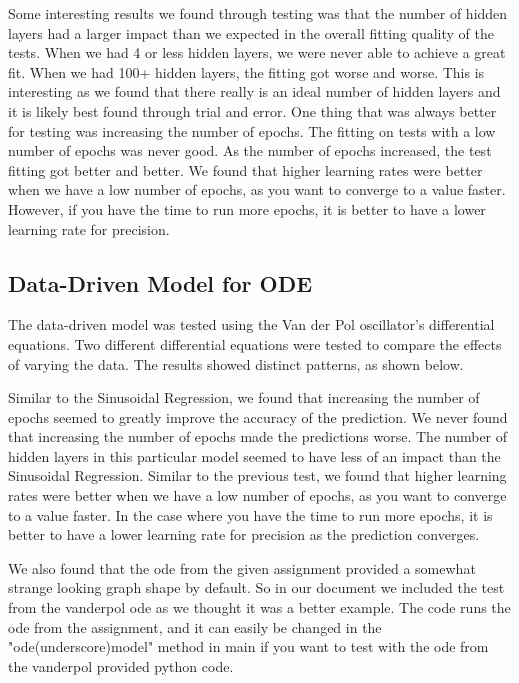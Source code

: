 \documentclass{article}
\begin{document}
Some interesting results we found through testing was that the number of hidden layers had a larger impact than we expected in the overall fitting quality of the tests. When we had 4 or less hidden layers, we were never able to achieve a great fit. When we had 100+ hidden layers, the fitting got worse and worse. This is interesting as we found that there really is an ideal number of hidden layers and it is likely best found through trial and error. One thing that was always better for testing was increasing the number of epochs. The fitting on tests with a low number of epochs was never good. As the number of epochs increased, the test fitting got better and better. We found that higher learning rates were better when we have a low number of epochs, as you want to converge to a value faster. However, if you have the time to run more epochs, it is better to have a lower learning rate for precision.

\subsection{Data-Driven Model for ODE}
The data-driven model was tested using the Van der Pol oscillator’s differential equations. Two different differential equations were tested to compare the effects of varying the data. The results showed distinct patterns, as shown below.

Similar to the Sinusoidal Regression, we found that increasing the number of epochs seemed to greatly improve the accuracy of the prediction. We never found that increasing the number of epochs made the predictions worse. The number of hidden layers in this particular model seemed to have less of an impact than the Sinusoidal Regression. Similar to the previous test, we found that higher learning rates were better when we have a low number of epochs, as you want to converge to a value faster. In the case where you have the time to run more epochs, it is better to have a lower learning rate for precision as the prediction converges.

We also found that the ode from the given assignment provided a somewhat strange looking graph shape by default. So in our document we included the test from the vanderpol ode as we thought it was a better example. The code runs the ode from the assignment, and it can easily be changed in the "ode(underscore)model" method in main if you want to test with the ode from the vanderpol provided python code.
\end{document}
